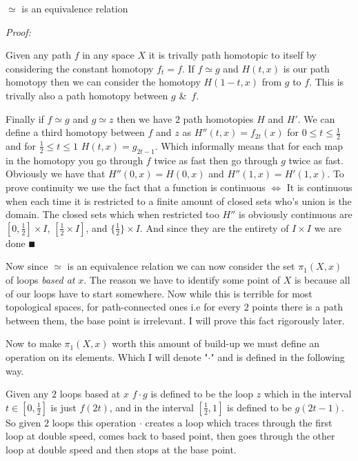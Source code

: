 \documentclass[paper=a4,fontsize=paper,12.5pt]{book}
\newcommand{\3}{\vspace*{3mm}}
\newcommand{\Proof}{\textit{Proof:}}
\newcommand{\IFF}{$\Longleftrightarrow$ \hspace*{.5mm}}
\begin{document}
\3

\begin{lemma}

$\simeq$ is an equivalence relation




\end{lemma}

\Proof


Given any path $f$ in any space $X$ it is trivally path homotopic to itself by considering the constant homotopy ${f}_{t} = f$. If $f \simeq g$ and $H(t,x)$ is our path homotopy then we can consider the homotopy $H(1-t,x)$ from $g$ to $f$. This is trivally also a path homotopy between $g$ \&\ $f$.

\3

Finally if $f \simeq g$ and $g \simeq z$ then we have $2$ path homotopies $H$ and $H'$. We can define a third homotopy between $f$ and $z$ as $H''(t,x) = {f}_{2t}(x) $ for $0 \leq t \leq \frac{1}{2}$ and for $\frac{1}{2} \leq t \leq 1$ $H(t,x) = {g}_{2t - 1}$. Which informally means that for each map in the homotopy you go through $f$ twice as fast then go through $g$ twice as fast. Obviously we have that $H''(0,x) = H(0,x)$ and $H''(1,x) = H'(1,x)$. To prove continuity we use the fact that a function is continuous \IFF It is continuous when each time it is restricted to a finite amount of closed sets who's union is the domain. The closed sets which when restricted too $H''$ is obviously continuous are $[0,\frac{1}{2}] \times I$, $[\frac{1}{2} \times I]$, and $\{\frac{1}{2}\} \times I$. And since they are the entirety of $I \times I$ we are done $\QED$

\3

Now since $\simeq$ is an equivalence relation we can now consider the set ${\pi}_{1}(X,{x})$ of loops \textit{based at} $x$. The reason we have to identify some point of $X$ is because all of our loops have to start somewhere. Now while this is terrible for most topological spaces, for path-connected ones i.e for every $2$ points there is a path between them, the base point is irrelevant. I will prove this fact rigorously later.

\3

Now to make ${\pi}_{1}(X,{x})$ worth this amount of build-up we must define an operation on its elements. Which I will denote "$\cdot$" and is defined in the following way.

\3

Given any $2$ loops based at $x$ $f \cdot g$ is defined to be the loop $z$ which in the interval $t \in [0,\frac{1}{2}]$ is just $f(2t)$, and in the interval $[\frac{1}{2},1]$ is defined to be $g(2t-1)$. So given $2$ loops this operation $\cdot$ creates a loop which traces through the first loop at double speed, comes back to based point, then goes through the other loop at double speed and then stops at the base point.
\end{document}
